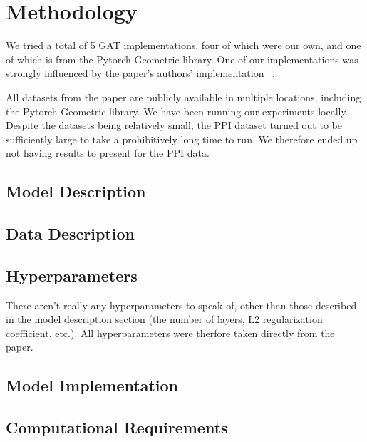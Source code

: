 \documentclass{article}
\begin{document}
    \section{Methodology}\label{sec:methodology}
    We tried a total of 5 GAT implementations, four of which were our own, and
    one of which is from the Pytorch Geometric library. One of our
    implementations was strongly influenced by the paper's authors'
    implementation ~\cite{petarvgatgithub}.

    All datasets from the paper are publicly available in multiple locations,
    including the Pytorch Geometric library. We have been running our
    experiments locally. Despite the datasets being relatively small, the PPI
    dataset turned out to be sufficiently large to take a prohibitively long
    time to run. We therefore ended up not having results to present for the
    PPI data.

    \subsection{Model Description}\label{subsec:model-description}
    

    \subsection{Data Description}\label{subsec:data-description}
    

    \subsection{Hyperparameters}\label{subsec:hyperparameters}
    There aren't really any hyperparameters to speak of, other than those
    described in the model description section (the number of layers, L2
    regularization coefficient, etc.). All hyperparameters were therfore taken
    directly from the paper.

    \subsection{Model Implementation}\label{subsec:model-implementation}
    

    \subsection{Computational Requirements}\label{subsec:computational-requirements}
    
\end{document}

